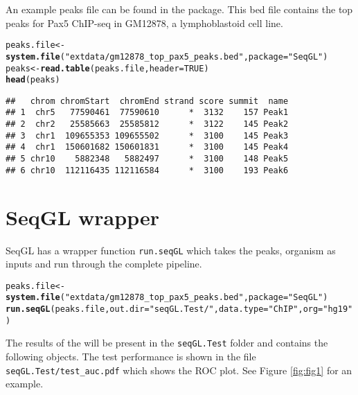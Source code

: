 \documentclass[10pt,oneside]{article}\usepackage[]{graphicx}\usepackage[]{color}
\makeatletter
\newcommand{\hlnum}[1]{\textcolor[rgb]{0.686,0.059,0.569}{#1}}%
\newcommand{\hlstr}[1]{\textcolor[rgb]{0.192,0.494,0.8}{#1}}%
\newcommand{\hlstd}[1]{\textcolor[rgb]{0.345,0.345,0.345}{#1}}%
\newcommand{\hlkwb}[1]{\textcolor[rgb]{0.69,0.353,0.396}{#1}}%
\newcommand{\hlkwc}[1]{\textcolor[rgb]{0.333,0.667,0.333}{#1}}%
\newcommand{\hlkwd}[1]{\textcolor[rgb]{0.737,0.353,0.396}{\textbf{#1}}}%
\newenvironment{kframe}{%
 \def\at@end@of@kframe{}%
 \ifinner\ifhmode%
  \def\at@end@of@kframe{\end{minipage}}%
  \begin{minipage}{\columnwidth}%
 \fi\fi%
 \def\FrameCommand##1{\hskip\@totalleftmargin \hskip-\fboxsep
 \colorbox{shadecolor}{##1}\hskip-\fboxsep
     \hskip-\linewidth \hskip-\@totalleftmargin \hskip\columnwidth}%
 \MakeFramed {\advance\hsize-\width
   \@totalleftmargin\z@ \linewidth\hsize
   \@setminipage}}%
 {\par\unskip\endMakeFramed%
 \at@end@of@kframe}
\newenvironment{knitrout}{}{} %
\makeatother
\begin{document}
An example peaks file can be found in the package. This bed file contains the top peaks for Pax5 ChIP-seq in GM12878, a lymphoblastoid cell line.
\begin{knitrout}
\color{fgcolor}\begin{kframe}
\begin{alltt}
\hlstd{peaks.file} \hlkwb{<-} \hlkwd{system.file}\hlstd{(}\hlstr{"extdata/gm12878_top_pax5_peaks.bed"}\hlstd{,} \hlkwc{package} \hlstd{=} \hlstr{"SeqGL"}\hlstd{)}
\hlstd{peaks} \hlkwb{<-} \hlkwd{read.table}\hlstd{(peaks.file,} \hlkwc{header} \hlstd{=} \hlnum{TRUE}\hlstd{)}
\hlkwd{head}\hlstd{(peaks)}
\end{alltt}
\begin{verbatim}
##   chrom chromStart  chromEnd strand score summit  name
## 1  chr5   77590461  77590610      *  3132    157 Peak1
## 2  chr2   25585663  25585812      *  3122    145 Peak2
## 3  chr1  109655353 109655502      *  3100    145 Peak3
## 4  chr1  150601682 150601831      *  3100    145 Peak4
## 5 chr10    5882348   5882497      *  3100    148 Peak5
## 6 chr10  112116435 112116584      *  3100    193 Peak6
\end{verbatim}
\end{kframe}
\end{knitrout}



\section{SeqGL wrapper}
SeqGL has a wrapper function \texttt{run.seqGL} which takes the peaks, organism as inputs and run through the complete pipeline.
\begin{knitrout}
\color{fgcolor}\begin{kframe}
\begin{alltt}
\hlstd{peaks.file} \hlkwb{<-} \hlkwd{system.file}\hlstd{(}\hlstr{"extdata/gm12878_top_pax5_peaks.bed"}\hlstd{,} \hlkwc{package} \hlstd{=} \hlstr{"SeqGL"}\hlstd{)}
\hlkwd{run.seqGL}\hlstd{(peaks.file,} \hlkwc{out.dir} \hlstd{=} \hlstr{"seqGL.Test/"}\hlstd{,} \hlkwc{data.type} \hlstd{=} \hlstr{"ChIP"}\hlstd{,} \hlkwc{org} \hlstd{=} \hlstr{"hg19"}\hlstd{)}
\end{alltt}
\end{kframe}
\end{knitrout}


The results of the will be present in the \texttt{seqGL.Test} folder and contains the following objects. 
The test performance is shown in the file \texttt{seqGL.Test/test\_auc.pdf} which shows the ROC plot. See Figure \ref{fig:fig1} for an example.
\end{document}
